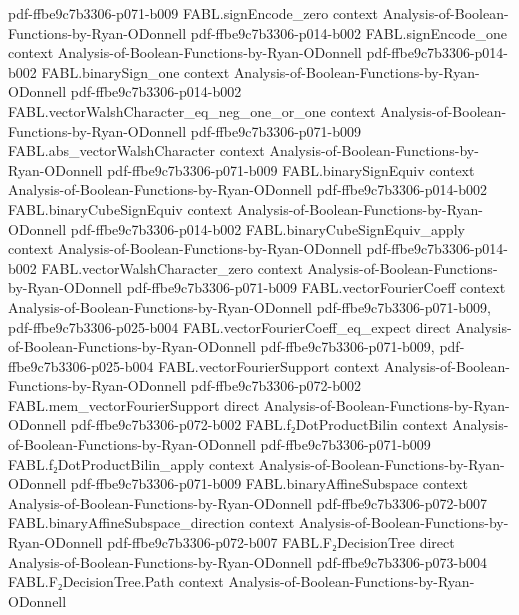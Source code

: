 \begin{theorem}
  {pdf-ffbe9c7b3306-p071-b009}
\proofstep
  {FABL.signEncode_zero}
  {context}
  {Analysis-of-Boolean-Functions-by-Ryan-ODonnell}
  {pdf-ffbe9c7b3306-p014-b002}
\proofstep
  {FABL.signEncode_one}
  {context}
  {Analysis-of-Boolean-Functions-by-Ryan-ODonnell}
  {pdf-ffbe9c7b3306-p014-b002}
\proofstep
  {FABL.binarySign_one}
  {context}
  {Analysis-of-Boolean-Functions-by-Ryan-ODonnell}
  {pdf-ffbe9c7b3306-p014-b002}
\proofstep
  {FABL.vectorWalshCharacter_eq_neg_one_or_one}
  {context}
  {Analysis-of-Boolean-Functions-by-Ryan-ODonnell}
  {pdf-ffbe9c7b3306-p071-b009}
\proofstep
  {FABL.abs_vectorWalshCharacter}
  {context}
  {Analysis-of-Boolean-Functions-by-Ryan-ODonnell}
  {pdf-ffbe9c7b3306-p071-b009}
\proofstep
  {FABL.binarySignEquiv}
  {context}
  {Analysis-of-Boolean-Functions-by-Ryan-ODonnell}
  {pdf-ffbe9c7b3306-p014-b002}
\proofstep
  {FABL.binaryCubeSignEquiv}
  {context}
  {Analysis-of-Boolean-Functions-by-Ryan-ODonnell}
  {pdf-ffbe9c7b3306-p014-b002}
\proofstep
  {FABL.binaryCubeSignEquiv_apply}
  {context}
  {Analysis-of-Boolean-Functions-by-Ryan-ODonnell}
  {pdf-ffbe9c7b3306-p014-b002}
\proofstep
  {FABL.vectorWalshCharacter_zero}
  {context}
  {Analysis-of-Boolean-Functions-by-Ryan-ODonnell}
  {pdf-ffbe9c7b3306-p071-b009}
\proofstep
  {FABL.vectorFourierCoeff}
  {context}
  {Analysis-of-Boolean-Functions-by-Ryan-ODonnell}
  {pdf-ffbe9c7b3306-p071-b009,
    pdf-ffbe9c7b3306-p025-b004}
\proofstep
  {FABL.vectorFourierCoeff_eq_expect}
  {direct}
  {Analysis-of-Boolean-Functions-by-Ryan-ODonnell}
  {pdf-ffbe9c7b3306-p071-b009,
    pdf-ffbe9c7b3306-p025-b004}
\proofstep
  {FABL.vectorFourierSupport}
  {context}
  {Analysis-of-Boolean-Functions-by-Ryan-ODonnell}
  {pdf-ffbe9c7b3306-p072-b002}
\proofstep
  {FABL.mem_vectorFourierSupport}
  {direct}
  {Analysis-of-Boolean-Functions-by-Ryan-ODonnell}
  {pdf-ffbe9c7b3306-p072-b002}
\proofstep
  {FABL.f₂DotProductBilin}
  {context}
  {Analysis-of-Boolean-Functions-by-Ryan-ODonnell}
  {pdf-ffbe9c7b3306-p071-b009}
\proofstep
  {FABL.f₂DotProductBilin_apply}
  {context}
  {Analysis-of-Boolean-Functions-by-Ryan-ODonnell}
  {pdf-ffbe9c7b3306-p071-b009}
\proofstep
  {FABL.binaryAffineSubspace}
  {context}
  {Analysis-of-Boolean-Functions-by-Ryan-ODonnell}
  {pdf-ffbe9c7b3306-p072-b007}
\proofstep
  {FABL.binaryAffineSubspace_direction}
  {context}
  {Analysis-of-Boolean-Functions-by-Ryan-ODonnell}
  {pdf-ffbe9c7b3306-p072-b007}
\proofstep
  {FABL.F₂DecisionTree}
  {direct}
  {Analysis-of-Boolean-Functions-by-Ryan-ODonnell}
  {pdf-ffbe9c7b3306-p073-b004}
\proofstep
  {FABL.F₂DecisionTree.Path}
  {context}
  {Analysis-of-Boolean-Functions-by-Ryan-ODonnell}

\end{theorem}
